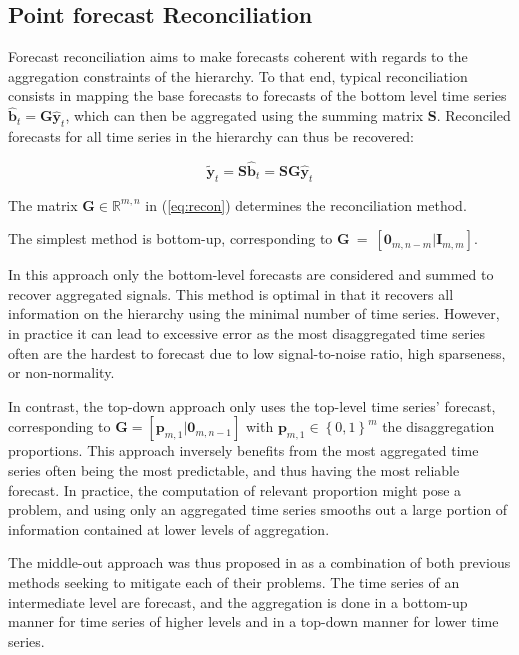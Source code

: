 \documentclass[letterpaper]{article}
\begin{document}
\subsection{Point forecast Reconciliation} \label{point_rec}

Forecast reconciliation aims to make forecasts coherent with regards to the aggregation constraints of the hierarchy. To that end, typical reconciliation consists in mapping the base forecasts to forecasts of the bottom level time series $\hat{\mathbf{b}}_t = \mathbf{G}\hat{\mathbf{y}}_t$, which can then be aggregated using the summing matrix $\mathbf{S}$. Reconciled forecasts for all time series in the hierarchy can thus be recovered: 

\begin{equation}
\tilde{\mathbf{y}}_t = \mathbf{S}\hat{\mathbf{b}}_t = \mathbf{SG}\hat{\mathbf{y}}_t
\label{eq:recon}
\end{equation}

The matrix $\mathbf{G} \in \mathbb{R}^{m,n}$ in (\ref{eq:recon}) determines the reconciliation method. 

The simplest method is bottom-up, corresponding to $\mathbf{G}~=~[\mathbf{0}_{m,n-m}|\mathbf{I}_{m,m}] $. 

In this approach only the bottom-level forecasts are considered and summed to recover aggregated signals. This method is optimal in that it recovers all information on the hierarchy using the minimal number of time series. However, in practice it can lead to excessive error as the most disaggregated time series often are the hardest to forecast due to low signal-to-noise ratio, high sparseness, or non-normality. 

In contrast, the top-down approach only uses the top-level time series' forecast, corresponding to $\mathbf{G} = [\mathbf{p}_{m,1}|\mathbf{0}_{m,n-1}] $ with $\mathbf{p}_{m,1}\in \left\{ 0,1\right\}^m$ the disaggregation proportions. This approach inversely benefits from the most aggregated time series often being the most predictable, and thus having the most reliable forecast. In practice, the computation of relevant proportion might pose a problem, and using only an aggregated time series smooths out a large portion of information contained at lower levels of aggregation. 

The middle-out approach was thus proposed in \cite{bookhyndman} as a combination of both previous methods seeking to mitigate each of their problems. The time series of an intermediate level are forecast, and the aggregation is done in a bottom-up manner for time series of higher levels and in a top-down manner for lower time series. 
\end{document}
